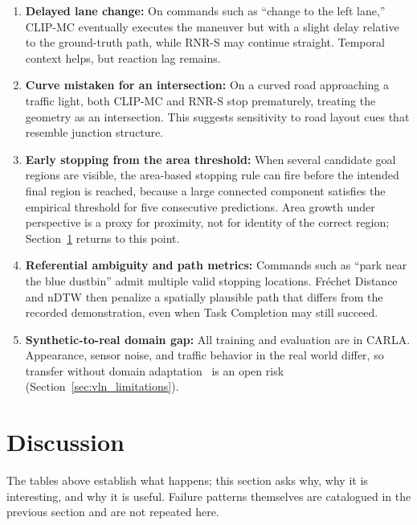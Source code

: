 \begin{enumerate}
    \item \textbf{Delayed lane change:} On commands such as ``change to the left lane,'' CLIP-MC eventually executes the maneuver but with a slight delay relative to the ground-truth path, while RNR-S may continue straight. Temporal context helps, but reaction lag remains.
    \item \textbf{Curve mistaken for an intersection:} On a curved road approaching a traffic light, both CLIP-MC and RNR-S stop prematurely, treating the geometry as an intersection. This suggests sensitivity to road layout cues that resemble junction structure.
    \item \textbf{Early stopping from the area threshold:} When several candidate goal regions are visible, the area-based stopping rule can fire before the intended final region is reached, because a large connected component satisfies the empirical threshold for five consecutive predictions. Area growth under perspective is a proxy for proximity, not for identity of the correct region; Section~\ref{sec:discussion} returns to this point.
    \item \textbf{Referential ambiguity and path metrics:} Commands such as ``park near the blue dustbin'' admit multiple valid stopping locations. Fr\'{e}chet Distance and nDTW then penalize a spatially plausible path that differs from the recorded demonstration, even when Task Completion may still succeed.
    \item \textbf{Synthetic-to-real domain gap:} All training and evaluation are in CARLA. Appearance, sensor noise, and traffic behavior in the real world differ, so transfer without domain adaptation~\cite{kundu2021generalize,kang2020pixel} is an open risk (Section~\ref{sec:vln_limitations}).
\end{enumerate}

\section{Discussion}
\label{sec:discussion}

The tables above establish what happens; this section asks why, why it is interesting, and why it is useful. Failure patterns themselves are catalogued in the previous section and are not repeated here.

